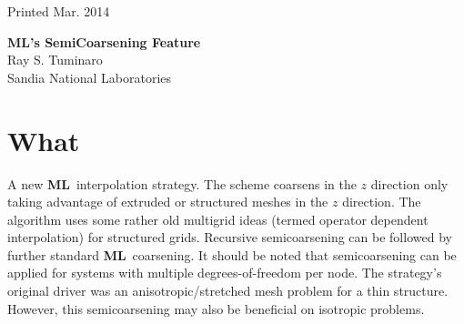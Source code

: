 \documentclass{article}[11pt]
\newcommand{\ML}     {{\bf ML}}
\begin{document}
\begin{center}

Printed Mar. 2014
\end{center}

\vspace{0.1in}

\begin{center}
{\Large {\bf ML's SemiCoarsening Feature}}\\
\vspace*{0.4in}
Ray S. Tuminaro \\
Sandia National Laboratories
\vspace*{.5in}
\end{center}
\begin{abstract}
An addition to the standard \ML\ manual describing a new semicoarsening
feature.
\end{abstract}
%
\section{What}
%
A new  \ML\  interpolation strategy.  The scheme coarsens in the $z$ direction only
taking advantage of extruded or structured meshes in the $z$ direction. The 
algorithm uses some rather old multigrid ideas (termed operator dependent 
interpolation) for structured grids.  Recursive semicoarsening can be followed
by further standard  \ML\  coarsening. It should be noted that semicoarsening can 
be applied for systems with multiple degrees-of-freedom per node. The strategy's
original driver was an anisotropic/stretched mesh problem for a thin structure.
However, this semicoarsening may also be beneficial on isotropic problems.

%
\end{document}
